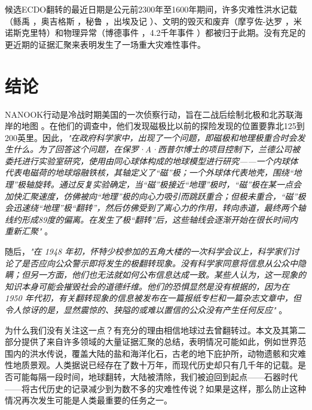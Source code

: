 \documentclass[10pt,twocolumn,letterpaper]{article}
\begin{document}
候选ECDO翻转的最近日期是公元前2300年至1600年期间，许多灾难性洪水记载（鲧禹 \cite{113,114,115}，奥吉格斯 \cite{116,117}，秘鲁 \cite{118,119}，出埃及记 \cite{120}）、文明的毁灭和废弃（摩亨佐-达罗 \cite{121}，米诺斯克里特\cite{100,101}）和物理异常（博德事件 \cite{122}，4.2千年事件 \cite{90}）都被归于此期。没有充足的更近期的证据汇聚来表明发生了一场重大灾难性事件。

\section{结论}

NANOOK行动是冷战时期美国的一次侦察行动，旨在二战后绘制北极和北苏联海岸的地图 \cite{137}。在他们的调查中，他们发现磁极比以前的探险发现的位置要靠北125到200英里。因此，\textit{"在政府科学家中，出现了一个问题，即磁极和地理极重合时会发生什么。为了回答这个问题，在保罗·A·西普尔博士的项目控制下，兰德公司被委托进行实验室研究，使用由同心球体构成的地球模型进行研究——一个内球体代表电磁荷的地球熔融铁核，其轴定义了“磁”极；一个外球体代表地壳，围绕“地理”极轴旋转。通过反复实验确定，当“磁”极接近“地理”极时，“磁”极在某一点会加快汇聚速度，仿佛被向“地理”极的向心力吸引而跳跃重合；但极未重合，“磁”极会迅速绕“地理”极“翻转”，然后仿佛受到了离心力的作用，转向赤道，最终两个轴线约形成89度的偏离。在发生了极“翻转”后，这些轴线会逐渐开始在很长时间内重新汇聚"} \cite{138,139}。

随后，\textit{"在 1948 年初，怀特少校参加的五角大楼的一次科学会议上，科学家们讨论了是否应向公众警示即将发生的极翻转现象。没有科学家同意将信息从公众中隐瞒；但另一方面，他们也无法就如何公布信息达成一致。某些人认为，这一现象的知识本身可能会摧毁社会的道德纤维。他们的恐惧显然是没有根据的，因为在 1950 年代初，有关翻转现象的信息被发布在一篇报纸专栏和一篇杂志文章中，但令人惊讶的是，显然震惊的、狭隘的或难以置信的公众没有产生任何反应"} \cite{138,139}。

为什么我们没有关注这一点？有充分的理由相信地球过去曾翻转过。本文及其第二部分提供了来自许多领域的大量证据汇聚的总结，表明情况可能如此，例如世界范围内的洪水传说，覆盖大陆的盐和海洋化石，古老的地下庇护所，动物遗骸和灾难性地质景观。人类据说已经存在了数十万年，而现代历史却只有几千年的记载。是否可能每隔一段时间，地球翻转，大陆被清除，我们被迫回到起点——石器时代——将古代历史的记录减少到为数不多的灾难性传说？如果是这样，那么防止这种情况再次发生可能是人类最重要的任务之一。
\end{document}
